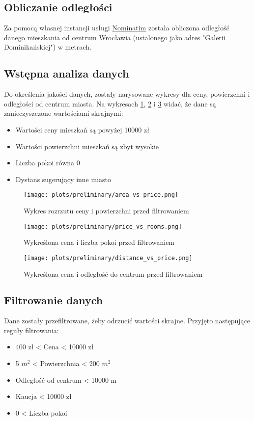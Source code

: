 \documentclass[12pt]{article}
\begin{document}
\subsection{Obliczanie odległości}
Za pomocą własnej instancji usługi \href{https://nominatim.org}{Nominatim} została obliczona odległość danego mieszkania od centrum Wrocławia (ustalonego jako adres "Galerii Dominikańskiej") w metrach.

\subsection{Wstępna analiza danych}
Do określenia jakości danych, zostały narysowane wykresy dla ceny, powierzchni i odległości od centrum miasta. Na wykresach \ref{fig:scatter_price_area}, \ref{fig:scatter_price_rooms} i \ref{fig:scatter_price_distance} widać, że dane są zanieczyszczone wartościami skrajnymi:
\begin{itemize}
  \item Wartości ceny mieszkań są powyżej 10000 zł 
  \item Wartości powierzchni mieszkań są zbyt wysokie
  \item Liczba pokoi równa 0
  \item Dystans sugerujący inne miasto
\end{itemize}

\begin{figure}[h]
  \centering
  \texttt{[image: plots/preliminary/area\_vs\_price.png]}
  \caption{Wykres rozrzutu ceny i powierzchni przed filtrowaniem}
  \label{fig:scatter_price_area}
\end{figure}

\begin{figure}[h]
  \centering
  \texttt{[image: plots/preliminary/price\_vs\_rooms.png]}
  \caption{Wykreślona cena i liczba pokoi przed filtrowaniem}
  \label{fig:scatter_price_rooms}
\end{figure}

\begin{figure}[h!]
  \centering
  \texttt{[image: plots/preliminary/distance\_vs\_price.png]}
  \caption{Wykreślona cena i odległość do centrum przed filtrowaniem}
  \label{fig:scatter_price_distance}
\end{figure}

\pagebreak
\subsection{Filtrowanie danych}
Dane zostały przefiltrowane, żeby odrzucić wartości skrajne. Przyjęto następujące reguły filtrowania:
  \begin{itemize}
    \item 400 zł < Cena < 10000 zł
    \item 5 $m^2$ < Powierzchnia < 200 $m^2$
    \item Odległość od centrum < 10000 m
    \item Kaucja < 10000 zł
    \item 0 < Liczba pokoi 
  \end{itemize}
\end{document}
